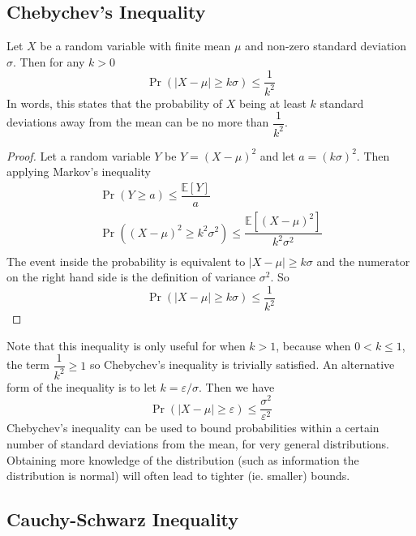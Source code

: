 \documentclass[11pt]{report} %
\begin{document}
\subsection{Chebychev's Inequality}

Let $X$ be a random variable with finite mean $\mu$ and non-zero standard deviation $\sigma$. Then for any $k > 0$
\begin{equation}
\operatorname{Pr}\left(\left|X - \mu\right| \geq k\sigma\right) \leq \dfrac{1}{k^{2}}
\end{equation}
In words, this states that the probability of $X$ being at least $k$ standard deviations away from the mean can be no more than $\dfrac{1}{k^{2}}$.
\begin{proof}
Let a random variable $Y$ be $Y = \left(X - \mu\right)^{2}$ and let $a = \left(k\sigma\right)^{2}$. Then applying Markov's inequality
\begin{gather}
\operatorname{Pr}\left(Y \geq a\right) \leq \dfrac{\mathbb{E}\left[Y\right]}{a} \\
\operatorname{Pr}\left(\left(X - \mu\right)^{2} \geq k^{2}\sigma^{2}\right) \leq \dfrac{\mathbb{E}\left[\left(X - \mu\right)^{2}\right]}{k^{2}\sigma^{2}} \\
\end{gather}
The event inside the probability is equivalent to $\left|X - \mu\right| \geq k\sigma$ and the numerator on the right hand side is the definition of variance $\sigma^{2}$. So
\begin{equation}
\operatorname{Pr}\left(\left|X - \mu\right| \geq k\sigma\right) \leq \dfrac{1}{k^{2}}
\end{equation}
\end{proof}
Note that this inequality is only useful for when $k > 1$, because when $0 < k \leq 1$, the term $\dfrac{1}{k^{2}} \geq 1$ so Chebychev's inequality is trivially satisfied. An alternative form of the inequality is to let $k = \varepsilon/\sigma$. Then we have
\begin{equation}
\operatorname{Pr}\left(\left|X - \mu\right| \geq \varepsilon\right) \leq \dfrac{\sigma^{2}}{\varepsilon^{2}}
\end{equation}
Chebychev's inequality can be used to bound probabilities within a certain number of standard deviations from the mean, for very general distributions. Obtaining more knowledge of the distribution (such as information the distribution is normal) will often lead to tighter (ie. smaller) bounds.

\subsection{Cauchy-Schwarz Inequality}
\end{document}
